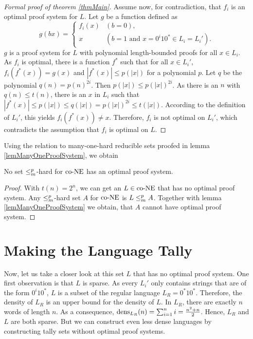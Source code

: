 \begin{proof}[Formal proof of theorem \ref{thmMain}]
    Assume now, for contradiction, that \(f_i\) is an optimal proof system for \(L\). Let \(g\) be a function defined as
      \[ g(bx) = \begin{cases}
                  f_i(x) & (b = 0), \\
                  x & (b = 1 \text{ and } x = 0^i10^* \in L_i = L_i').
                 \end{cases} \]
    \(g\) is a proof system for \(L\) with polynomial length-bounded proofs for all \(x \in L_i\). As \(f_i\) is optimal, there is a function \(f^*\) such that for all \(x \in L_i'\), \(f_i(f^*(x)) = g(x)\) and \(|f^*(x)| \leq p(|x|)\) for a polynomial \(p\). Let \(q\) be the polynomial \(q(n) = p(n)^{2i}\). Then \(p(|x|) \leq p(|x|)^{2i}\). As there is an \(n\) with \(q(n) \leq t(n)\), there is an \(x\) in \(L_i\) such that \(|f^*(x)| \leq p(|x|) \leq q(|x|) = p(|x|)^{2i} \leq t(|x|)\). According to the definition of \(L_i'\), this yields \(f_i(f^*(x)) \neq x\). Therefore, \(f_i\) is not optimal on \(L_i'\), which contradicts the assumption that \(f_i\) is optimal on \(L\).
  \end{proof}

  Using the relation to many-one-hard reducible sets proofed in lemma \ref{lemManyOneProofSystem}, we obtain

  \begin{corollary} \label{corHardSets}
    No set \(\leq_{m}^{p}\)-hard for \(\text{co-NE}\) has an optimal proof system.
  \end{corollary}

  \begin{proof}
    With \(t(n) = 2^n\), we can get an \(L \in \text{co-NE}\) that has no optimal proof system. Any \(\leq_{m}^{p}\)-hard set \(A\) for \(\text{co-NE}\) is \(L \leq_{m}^{p} A\). Together with lemma \ref{lemManyOneProofSystem} we obtain, that \(A\) cannot have optimal proof system.
  \end{proof}

  \section{Making the Language Tally}

  Now, let us take a closer look at this set \(L\) that has no optimal proof system. One first observation is that \(L\) is sparse. As every \(L_i'\) only contains strings that are of the form \(0^i10^*\), \(L\) is a subset of the regular language \(L_R = 0^*10^*\). Therefore, the density of \(L_R\) is an upper bound for the density of \(L\). In \(L_R\), there are exactly \(n\) words of length \(n\). As a consequence, \(\operatorname{dens}_{L_R}(n) = \sum_{i=1}^n i = \frac{n^2 + n}{2}\). Hence, \(L_R\) and \(L\) are both sparse. But we can construct even less dense languages by constructing tally sets without optimal proof systems.

